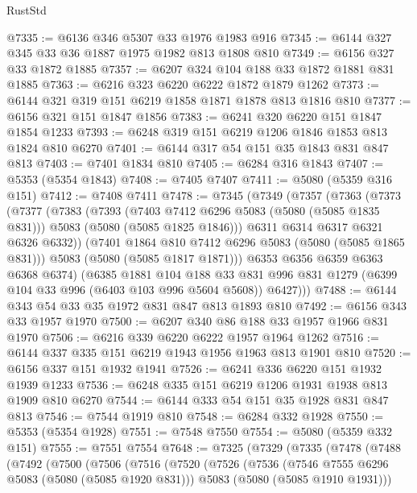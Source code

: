 \begin{lexlean}{RustStd}
\begin{coremodule}
{\begin{coremodule}
{{{{{@7335 := @6136 @346 @5307 @33 @1976 @1983 @916
@7345 := @6144 @327 @345 @33 @36 @1887 @1975 @1982 @813 @1808 @810
@7349 := @6156 @327 @33 @1872 @1885
@7357 := @6207 @324 @104 @188 @33 @1872 @1881 @831 @1885
@7363 := @6216 @323 @6220 @6222 @1872 @1879 @1262
@7373 := @6144 @321 @319 @151 @6219 @1858 @1871 @1878 @813 @1816 @810
@7377 := @6156 @321 @151 @1847 @1856
@7383 := @6241 @320 @6220 @151 @1847 @1854 @1233
@7393 := @6248 @319 @151 @6219 @1206 @1846 @1853 @813 @1824 @810 @6270
@7401 := @6144 @317 @54 @151 @35 @1843 @831 @847 @813
@7403 := @7401 @1834 @810
@7405 := @6284 @316 @1843
@7407 := @5353 (@5354 @1843)
@7408 := @7405 @7407
@7411 := @5080 (@5359 @316 @151)
@7412 := @7408 @7411
@7478 := @7345
    (@7349
      (@7357
        (@7363
          (@7373
            (@7377
              (@7383
                (@7393
                  (@7403 @7412 @6296 @5083 (@5080 (@5085 @1835 @831)))
                  @5083
                  (@5080 (@5085 @1825 @1846)))
                @6311
                @6314
                @6317
                @6321
                @6326
                @6332))
            (@7401 @1864 @810 @7412 @6296 @5083 (@5080 (@5085 @1865 @831)))
            @5083
            (@5080 (@5085 @1817 @1871)))
          @6353
          @6356
          @6359
          @6363
          @6368
          @6374)
        (@6385
          @1881
          @104
          @188
          @33
          @831
          @996
          @831
          @1279
          (@6399 @104 @33 @996 (@6403 @103 @996 @5604 @5608))
          @6427)))
@7488 := @6144 @343 @54 @33 @35 @1972 @831 @847 @813 @1893 @810
@7492 := @6156 @343 @33 @1957 @1970
@7500 := @6207 @340 @86 @188 @33 @1957 @1966 @831 @1970
@7506 := @6216 @339 @6220 @6222 @1957 @1964 @1262
@7516 := @6144 @337 @335 @151 @6219 @1943 @1956 @1963 @813 @1901 @810
@7520 := @6156 @337 @151 @1932 @1941
@7526 := @6241 @336 @6220 @151 @1932 @1939 @1233
@7536 := @6248 @335 @151 @6219 @1206 @1931 @1938 @813 @1909 @810 @6270
@7544 := @6144 @333 @54 @151 @35 @1928 @831 @847 @813
@7546 := @7544 @1919 @810
@7548 := @6284 @332 @1928
@7550 := @5353 (@5354 @1928)
@7551 := @7548 @7550
@7554 := @5080 (@5359 @332 @151)
@7555 := @7551 @7554
@7648 := @7325
    (@7329
      (@7335
        (@7478
          (@7488
            (@7492
              (@7500
                (@7506
                  (@7516
                    (@7520
                      (@7526
                        (@7536
                          (@7546 @7555 @6296 @5083 (@5080 (@5085 @1920 @831)))
                          @5083
                          (@5080 (@5085 @1910 @1931)))
}}}}}
\end{coremodule}}
\end{coremodule}
\end{lexlean}
